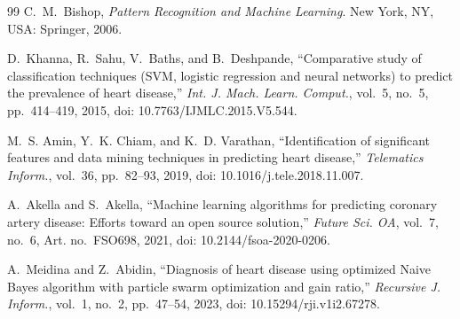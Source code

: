 \documentclass[conference]{IEEEtran}
\begin{document}
\begin{thebibliography}{99}
C.~M.~Bishop,
\textit{Pattern Recognition and Machine Learning}.
New York, NY, USA: Springer, 2006.

D.~Khanna, R.~Sahu, V.~Baths, and B.~Deshpande,
``Comparative study of classification techniques (SVM, logistic regression and neural networks) to predict the prevalence of heart disease,''
\textit{Int. J. Mach. Learn. Comput.}, vol.~5, no.~5, pp.~414--419, 2015, doi: 10.7763/IJMLC.2015.V5.544.

M.~S. Amin, Y.~K. Chiam, and K.~D. Varathan,
``Identification of significant features and data mining techniques in predicting heart disease,''
\textit{Telematics Inform.}, vol.~36, pp.~82--93, 2019, doi: 10.1016/j.tele.2018.11.007.

A.~Akella and S.~Akella,
``Machine learning algorithms for predicting coronary artery disease: Efforts toward an open source solution,''
\textit{Future Sci. OA}, vol.~7, no.~6, Art. no.~FSO698, 2021, doi: 10.2144/fsoa-2020-0206.

A.~Meidina and Z.~Abidin,
``Diagnosis of heart disease using optimized Naive Bayes algorithm with particle swarm optimization and gain ratio,''
\textit{Recursive J. Inform.}, vol.~1, no.~2, pp.~47--54, 2023, doi: 10.15294/rji.v1i2.67278.

\end{thebibliography}
\end{document}
